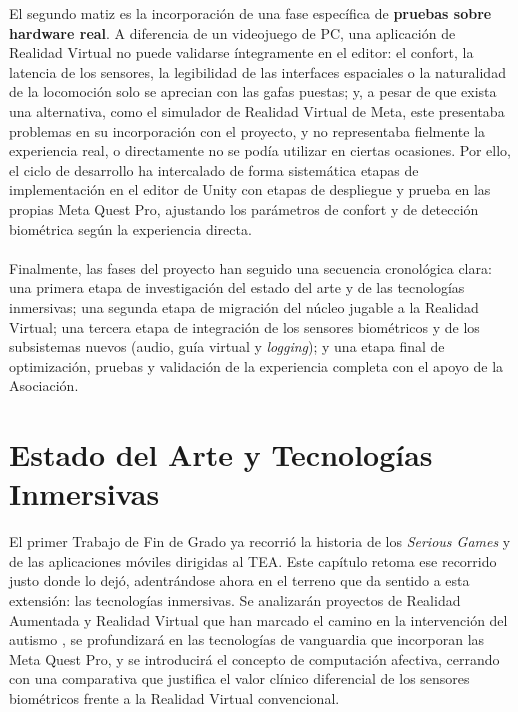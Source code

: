 \documentclass[12pt,twoside,titlepage]{report}
\begin{document}
El segundo matiz es la incorporación de una fase específica de \textbf{pruebas sobre hardware real}.
A diferencia de un videojuego de PC, una aplicación de Realidad Virtual no puede validarse íntegramente en el editor: el confort, la latencia de los sensores, la legibilidad de las interfaces espaciales o la naturalidad de la locomoción solo se aprecian con las gafas puestas; y, a pesar de que exista una alternativa, como el simulador de Realidad Virtual de Meta, este presentaba problemas en su incorporación con el proyecto, y no representaba fielmente la experiencia real, o directamente no se podía utilizar en ciertas ocasiones.
Por ello, el ciclo de desarrollo ha intercalado de forma sistemática etapas de implementación en el editor de Unity con etapas de despliegue y prueba en las propias Meta Quest Pro, ajustando los parámetros de confort y de detección biométrica según la experiencia directa.\\
\\
Finalmente, las fases del proyecto han seguido una secuencia cronológica clara: una primera etapa de investigación del estado del arte y de las tecnologías inmersivas; una segunda etapa de migración del núcleo jugable a la Realidad Virtual; una tercera etapa de integración de los sensores biométricos y de los subsistemas nuevos (audio, guía virtual y \textit{logging}); y una etapa final de optimización, pruebas y validación de la experiencia completa con el apoyo de la Asociación.


\pagestyle{fancy}


\setlength{\parskip}{0.75em}
\renewcommand{\baselinestretch}{1.25}
\setcounter{page}{1}



\chapter{Estado del Arte y Tecnologías Inmersivas}

El primer Trabajo de Fin de Grado ya recorrió la historia de los \textit{Serious Games} y de las aplicaciones móviles dirigidas al TEA.
Este capítulo retoma ese recorrido justo donde lo dejó, adentrándose ahora en el terreno que da sentido a esta extensión: las tecnologías inmersivas.
Se analizarán proyectos de Realidad Aumentada y Realidad Virtual que han marcado el camino en la intervención del autismo \parencite{mesa2018}, se profundizará en las tecnologías de vanguardia que incorporan las Meta Quest Pro, y se introducirá el concepto de computación afectiva, cerrando con una comparativa que justifica el valor clínico diferencial de los sensores biométricos frente a la Realidad Virtual convencional.
\end{document}
